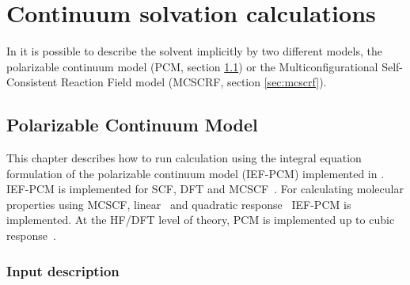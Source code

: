 \chapter{Continuum solvation calculations}\label{ch:solvent}

In {\dalton} it is possible to describe the solvent implicitly by two
different models, the polarizable continuum model (PCM, section
\ref{sec:pcm}) or the Multiconfigurational Self-Consistent Reaction
Field model (MCSCRF, section \ref{sec:mcscrf}).

\section{Polarizable Continuum Model}
\label{sec:pcm}

This chapter describes how to run calculation using the integral
equation formulation of the polarizable continuum model (IEF-PCM)
implemented in {\dalton}. IEF-PCM is implemented for SCF,
DFT and MCSCF~\cite{cammi02}. For calculating molecular properties
using MCSCF, linear~\cite{cammi03} and quadratic
response~\cite{frediani05} IEF-PCM is implemented. At the HF/DFT level
of theory, PCM is implemented up to cubic response~\cite{ferrighi07}.

\begin{center}
\end{center}

\subsection{Input description}\label{sec:pcminp}

